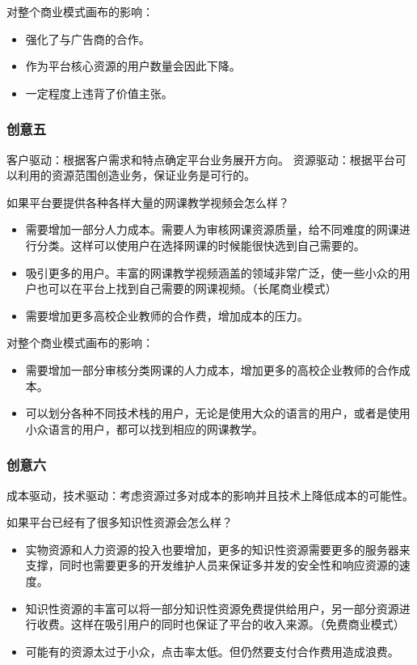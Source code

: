 \documentclass[a4paper]{ctexart}
\begin{document}
对整个商业模式画布的影响：
\begin{itemize}
  \item 强化了与广告商的合作。
  \item 作为平台核心资源的用户数量会因此下降。
  \item 一定程度上违背了价值主张。
\end{itemize}

\subsubsection{创意五}
客户驱动：根据客户需求和特点确定平台业务展开方向。
资源驱动：根据平台可以利用的资源范围创造业务，保证业务是可行的。

如果平台要提供各种各样大量的网课教学视频会怎么样？
\begin{itemize}
  \item 需要增加一部分人力成本。需要人为审核网课资源质量，给不同难度的网课进行分类。这样可以使用户在选择网课的时候能很快选到自己需要的。
  \item 吸引更多的用户。丰富的网课教学视频涵盖的领域非常广泛，使一些小众的用户也可以在平台上找到自己需要的网课视频。（长尾商业模式）
  \item 需要增加更多高校企业教师的合作费，增加成本的压力。
\end{itemize}

对整个商业模式画布的影响：
\begin{itemize}
  \item 需要增加一部分审核分类网课的人力成本，增加更多的高校企业教师的合作成本。
  \item 可以划分各种不同技术栈的用户，无论是使用大众的语言的用户，或者是使用小众语言的用户，都可以找到相应的网课教学。
\end{itemize}

\subsubsection{创意六}
成本驱动，技术驱动：考虑资源过多对成本的影响并且技术上降低成本的可能性。

如果平台已经有了很多知识性资源会怎么样？
\begin{itemize}
  \item 实物资源和人力资源的投入也要增加，更多的知识性资源需要更多的服务器来支撑，同时也需要更多的开发维护人员来保证多并发的安全性和响应资源的速度。
  \item 知识性资源的丰富可以将一部分知识性资源免费提供给用户，另一部分资源进行收费。这样在吸引用户的同时也保证了平台的收入来源。（免费商业模式）
  \item 可能有的资源太过于小众，点击率太低。但仍然要支付合作费用造成浪费。
\end{itemize}
\end{document}
